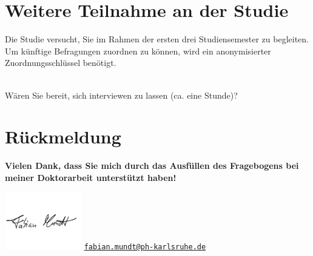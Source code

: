 
\vspace{-.25cm}
\section{Weitere Teilnahme an der Studie}
\vspace{.25cm}

\begin{choicequestion}[4]{Die Studie versucht, Sie im Rahmen der ersten drei Studiensemester zu begleiten. Um künftige Befragungen zuordnen zu können, wird ein anonymisierter Zuordnungsschlüssel benötigt.}
	\\
	\\
\end{choicequestion}

\separate

\begin{choicequestion}[1]{Wären Sie bereit, sich interviewen zu lassen (ca. eine Stunde)?}
\end{choicequestion}

\vspace{.25cm}
\section{Rückmeldung}
\vspace{.25cm}



\separate

\textbf{Vielen Dank, dass Sie mich durch das Ausfüllen des Fragebogens bei meiner Doktorarbeit unterstützt haben!}

\vspace{-1.5cm}
\flushright
\includegraphics[width=0.25\textwidth]{unterschrift.png}
\vspace{-1.5cm}
\flushright
\href{mailto:fabian.mundt@ph-karlsruhe.de}{\nolinkurl{fabian.mundt@ph-karlsruhe.de}}
